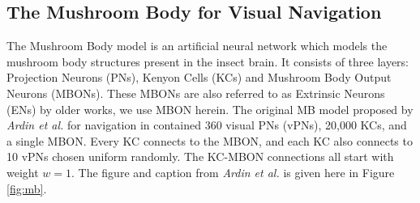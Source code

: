 \documentclass[a4paper,11pt,twoside,openright]{article}
\begin{document}







\subsection{ The Mushroom Body for Visual Navigation } \label{MBBackground}
The Mushroom Body model is an artificial neural network which models
the mushroom body structures present in the insect brain\cite{Ardin2016}. It
consists of three layers: Projection Neurons (PNs), Kenyon Cells (KCs) and
Mushroom Body Output Neurons (MBONs). These MBONs are also referred to as
Extrinsic Neurons (ENs) by older works, we use MBON herein. The original MB model
proposed by \textit{Ardin et al.} for navigation in \cite{Ardin2016} contained
360 visual PNs (vPNs), 20,000 KCs, and a single MBON. Every KC connects to the
MBON, and each KC also connects to 10 vPNs chosen uniform randomly. The KC-MBON
connections all start with weight $w=1$. The figure and caption from
\textit{Ardin et al.} is given here in Figure \ref{fig:mb}.
\end{document}
